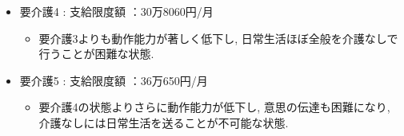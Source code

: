 \begin{itemize}
\begin{itemize}
	      \end{itemize}

	\item 要介護4 : 支給限度額 ：30万8060円/月


	      \begin{itemize} \setlength{\itemsep}{-0.5mm} \setlength{\parskip}{-0.5mm}
		      \item 要介護3よりも動作能力が著しく低下し, 日常生活ほぼ全般を介護なしで行うことが困難な状態.

	      \end{itemize}

	\item 要介護5 : 支給限度額 ：36万650円/月


	      \begin{itemize} \setlength{\itemsep}{-0.5mm} \setlength{\parskip}{-0.5mm}
		      \item 要介護4の状態よりさらに動作能力が低下し, 意思の伝達も困難になり, 介護なしには日常生活を送ることが不可能な状態.

	      \end{itemize}


\end{itemize}












%





